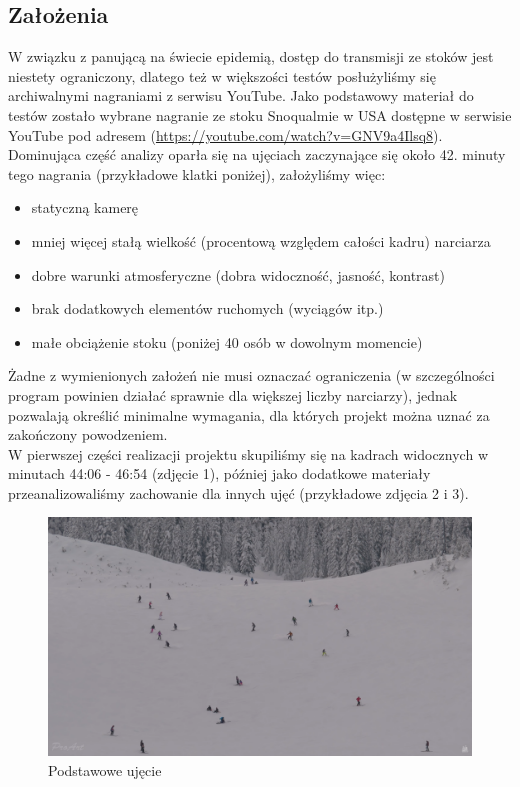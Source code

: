 \documentclass[a4paper]{article}
\begin{document}
\subsection{Założenia}
W związku z panującą na świecie epidemią, dostęp do transmisji ze stoków jest niestety ograniczony, dlatego też w większości testów posłużyliśmy się archiwalnymi nagraniami z serwisu YouTube. Jako podstawowy materiał do testów zostało wybrane nagranie ze stoku Snoqualmie w USA dostępne w serwisie YouTube pod adresem (\url{https://youtube.com/watch?v=GNV9a4Ilsq8}).\\ 
Dominująca część analizy oparła się na ujęciach zaczynające się około 42. minuty tego nagrania (przykładowe klatki poniżej), założyliśmy więc:
\begin{itemize}
\item statyczną kamerę
\item mniej więcej stałą wielkość (procentową względem całości kadru) narciarza
\item dobre warunki atmosferyczne (dobra widoczność, jasność, kontrast)
\item brak dodatkowych elementów ruchomych (wyciągów itp.)
\item małe obciążenie stoku (poniżej 40 osób w dowolnym momencie)
\end{itemize}
Żadne z wymienionych założeń nie musi oznaczać ograniczenia (w szczególności program powinien działać sprawnie dla większej liczby narciarzy), jednak pozwalają określić minimalne wymagania, dla których projekt można uznać za zakończony powodzeniem.\\
W pierwszej części realizacji projektu skupiliśmy się na kadrach widocznych w minutach 44:06 - 46:54 (zdjęcie 1), później jako dodatkowe materiały przeanalizowaliśmy zachowanie dla innych ujęć (przykładowe zdjęcia 2 i 3).
\begin{figure}[H]
  \includegraphics[width=\linewidth]{resources/img1.png}
  \caption{Podstawowe ujęcie}
\end{figure}
\end{document}
